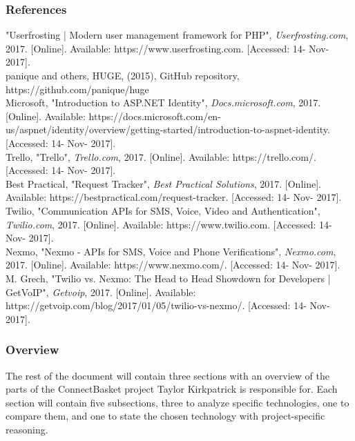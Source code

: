 \documentclass[onecolumn, draftclsnofoot,10pt, compsoc]{IEEEtran}
\begin{document}
\subsubsection{References}
\begin{thebibliography}{8}
"Userfrosting | Modern user management framework for PHP", \textit{Userfrosting.com}, 2017. [Online]. Available: https://www.userfrosting.com. [Accessed: 14- Nov- 2017].\\
 panique and others, HUGE, (2015), GitHub repository, https://github.com/panique/huge \\ 
 Microsoft, "Introduction to ASP.NET Identity", \textit{Docs.microsoft.com}, 2017. [Online]. Available: https://docs.microsoft.com/en-us/aspnet/identity/overview/getting-started/introduction-to-aspnet-identity. [Accessed: 14- Nov- 2017].\\
 Trello, "Trello", \textit{Trello.com}, 2017. [Online]. Available: https://trello.com/. [Accessed: 14- Nov- 2017].\\
 Best Practical, "Request Tracker", \textit{Best Practical Solutions}, 2017. [Online]. Available: https://bestpractical.com/request-tracker. [Accessed: 14- Nov- 2017].\\
 Twilio, "Communication APIs for SMS, Voice, Video and Authentication", \textit{Twilio.com}, 2017. [Online]. Available: https://www.twilio.com. [Accessed: 14- Nov- 2017].\\
 Nexmo, "Nexmo - APIs for SMS, Voice and Phone Verifications", \textit{Nexmo.com}, 2017. [Online]. Available: https://www.nexmo.com/. [Accessed: 14- Nov- 2017].\\
 M. Grech, "Twilio vs. Nexmo: The Head to Head Showdown for Developers | GetVoIP", \textit{Getvoip}, 2017. [Online]. Available: https://getvoip.com/blog/2017/01/05/twilio-vs-nexmo/. [Accessed: 14- Nov- 2017].\\
\end{thebibliography}
\subsubsection{Overview}
The rest of the document will contain three sections with an overview of the parts of the ConnectBasket project Taylor Kirkpatrick 
is responsible for. Each section will contain five subsections, three to analyze specific technologies, one to compare them, and one 
to state the chosen technology with project-specific reasoning.
\end{document}
